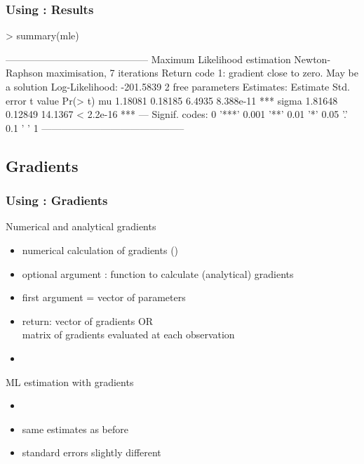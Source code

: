 \documentclass{beamer}
\begin{document}
\begin{frame}[containsverbatim]
\frametitle{Using : Results}
\begin{small}
\begin{Schunk}
\begin{Sinput}
> summary(mle)
\end{Sinput}
\begin{Soutput}
--------------------------------------------
Maximum Likelihood estimation
Newton-Raphson maximisation, 7 iterations
Return code 1: gradient close to zero. May be a solution
Log-Likelihood: -201.5839 
2  free parameters
Estimates:
      Estimate Std. error t value   Pr(> t)    
mu     1.18081    0.18185  6.4935 8.388e-11 ***
sigma  1.81648    0.12849 14.1367 < 2.2e-16 ***
---
Signif. codes:  0 '***' 0.001 '**' 0.01 '*' 0.05 '.' 0.1 ' ' 1
--------------------------------------------
\end{Soutput}
\end{Schunk}
\end{small}
\end{frame}

\subsection{Gradients}
\begin{frame}
\frametitle{Using : Gradients}
Numerical and analytical gradients
\begin{itemize}
\item numerical calculation of gradients
   ()
\item optional argument :
   function to calculate (analytical) gradients
\item first argument = vector of parameters
\item return: vector of gradients OR\\
   matrix of gradients evaluated at each observation
\item {}
\end{itemize}
\vspace*{2ex}
ML estimation with gradients
\begin{itemize}
\item {}
\item same estimates as before
\item standard errors slightly different
\end{itemize}
\end{frame}
\end{document}
